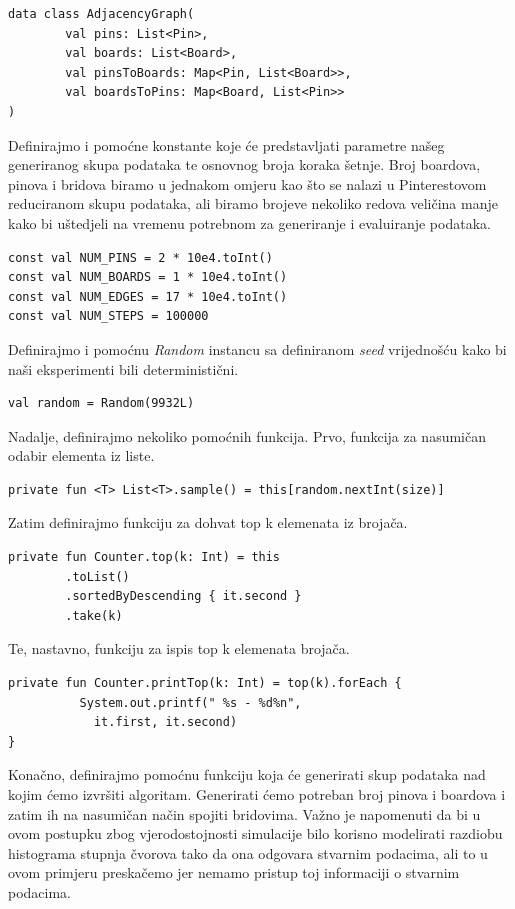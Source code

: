 \documentclass[times, utf8, seminar]{fer}
\begin{document}
\begin{lstlisting}
data class AdjacencyGraph(
        val pins: List<Pin>,
        val boards: List<Board>,
        val pinsToBoards: Map<Pin, List<Board>>,
        val boardsToPins: Map<Board, List<Pin>>
)
\end{lstlisting}

Definirajmo i pomoćne konstante koje će predstavljati parametre našeg generiranog skupa podataka te osnovnog broja koraka šetnje. Broj boardova, pinova i bridova biramo u jednakom omjeru kao što se nalazi u Pinterestovom reduciranom skupu podataka, ali biramo brojeve nekoliko redova veličina manje kako bi uštedjeli na vremenu potrebnom za generiranje i evaluiranje podataka.

\begin{lstlisting}
const val NUM_PINS = 2 * 10e4.toInt()
const val NUM_BOARDS = 1 * 10e4.toInt()
const val NUM_EDGES = 17 * 10e4.toInt()
const val NUM_STEPS = 100000
\end{lstlisting}

Definirajmo i pomoćnu \textit{Random} instancu sa definiranom \textit{seed} vrijednošću kako bi naši eksperimenti bili deterministični.

\begin{lstlisting}
val random = Random(9932L)
\end{lstlisting}

Nadalje, definirajmo nekoliko pomoćnih funkcija. Prvo, funkcija za nasumičan odabir elementa iz liste.

\begin{lstlisting}
private fun <T> List<T>.sample() = this[random.nextInt(size)]
\end{lstlisting}

Zatim definirajmo funkciju za dohvat top k elemenata iz brojača.

\begin{lstlisting}
private fun Counter.top(k: Int) = this
        .toList()
        .sortedByDescending { it.second }
        .take(k)
\end{lstlisting}

Te, nastavno, funkciju za ispis top k elemenata brojača.

\begin{lstlisting}
private fun Counter.printTop(k: Int) = top(k).forEach {
		  System.out.printf(" %s - %d%n",
		  	it.first, it.second)
}
\end{lstlisting}

Konačno, definirajmo pomoćnu funkciju koja će generirati skup podataka nad kojim ćemo izvršiti algoritam. Generirati ćemo potreban broj pinova i boardova i zatim ih na nasumičan način spojiti bridovima. Važno je napomenuti da bi u ovom postupku zbog vjerodostojnosti simulacije bilo korisno modelirati razdiobu histograma stupnja čvorova tako da ona odgovara stvarnim podacima, ali to u ovom primjeru preskačemo jer nemamo pristup toj informaciji o stvarnim podacima.
\end{document}
